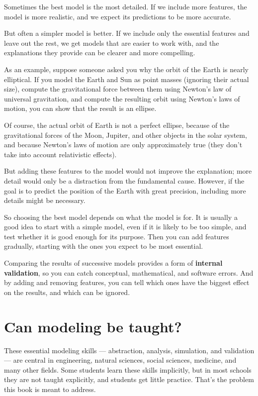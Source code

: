 \documentclass[12pt]{book}
\theoremstyle{exercise}
\begin{document}
Sometimes the best model is the most detailed.  If we include more features, the model is more realistic, and we expect its predictions to be more accurate.

But often a simpler model is better.  If we include only the essential features and leave out the rest, we get models that are easier to work with, and the explanations they provide can be clearer and more compelling.

As an example, suppose someone asked you why the orbit of the Earth is nearly elliptical.  If you model the Earth and Sun as point masses (ignoring their actual size), compute the gravitational force between them using Newton's law of universal gravitation, and compute the resulting orbit using Newton's laws of motion, you can show that the result is an ellipse.

Of course, the actual orbit of Earth is not a perfect ellipse, because of the gravitational forces of the Moon, Jupiter, and other objects in the solar system, and because Newton's laws of motion are only approximately true (they don't take into account relativistic effects).

But adding these features to the model would not improve the explanation; more detail would only be a distraction from the fundamental cause.  However, if the goal is to predict the position of the Earth with great precision, including more details might be necessary.  

So choosing the best model depends on what the model is for.  It is usually a good idea to start with a simple model, even if it is likely to be too simple, and test whether it is good enough for its purpose.  Then you can add features gradually, starting with the ones you expect to be most essential.

Comparing the results of successive models provides a form of {\bf internal validation}, so you can catch conceptual, mathematical, and software errors.  And by adding and removing features, you can tell which ones have the biggest effect on the results, and which can be ignored.


\section{Can modeling be taught?}

These essential modeling skills --- abstraction, analysis, simulation, and validation --- are central in engineering, natural sciences, social sciences, medicine, and many other fields.  Some students learn these skills implicitly, but in most schools they are not taught explicitly, and students get little practice.  That's the problem this book is meant to address.  
\end{document}
